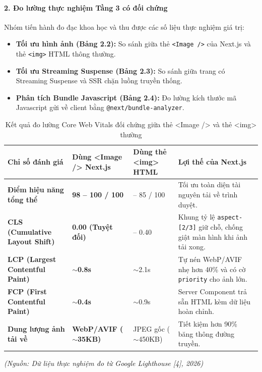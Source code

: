 \documentclass[13pt,a4paper]{extarticle}
\begin{document}
\paragraph{2. Đo lường thực nghiệm Tầng 3 có đối chứng}
Nhóm tiến hành đo đạc khoa học và thu được các số liệu thực nghiệm giá trị:
\begin{itemize}[noitemsep]
    \item \textbf{Tối ưu hình ảnh (Bảng 2.2):} So sánh giữa thẻ \texttt{<Image />} của Next.js và thẻ \texttt{<img>} HTML thông thường.
    \item \textbf{Tối ưu Streaming Suspense (Bảng 2.3):} So sánh giữa trang có Streaming Suspense và SSR chặn luồng truyền thống.
    \item \textbf{Phân tích Bundle Javascript (Bảng 2.4):} Đo lường kích thước mã Javascript gửi về client bằng \texttt{@next/bundle-analyzer}.
\end{itemize}

\begin{table}[H]
\centering
\caption{Kết quả đo lường Core Web Vitals đối chứng giữa thẻ <Image /> và thẻ <img> thường}
\label{tab:vitals}
\begin{tabularx}{\textwidth}{>{\raggedright\arraybackslash}p{4.5cm}>{\centering\arraybackslash}p{3cm}>{\centering\arraybackslash}p{3cm}>{\raggedright\arraybackslash}X}
\toprule
\textbf{Chỉ số đánh giá} & \textbf{Dùng <Image /> Next.js} & \textbf{Dùng thẻ <img> HTML} & \textbf{Lợi thế của Next.js} \\
\midrule
\textbf{Điểm hiệu năng tổng thể} & \textbf{98 -- 100 / 100} & 78 -- 85 / 100 & Tối ưu toàn diện tài nguyên tải về trình duyệt. \\
\midrule
\textbf{CLS (Cumulative Layout Shift)} & \textbf{0.00 (Tuyệt đối)} & 0.25 -- 0.40 & Khung tỷ lệ \texttt{aspect-[2/3]} giữ chỗ, chống giật màn hình khi ảnh tải xong. \\
\midrule
\textbf{LCP (Largest Contentful Paint)} & \textbf{$\sim$0.8s} & $\sim$2.1s & Tự nén WebP/AVIF nhẹ hơn 40\% và có cờ \texttt{priority} cho ảnh lớn. \\
\midrule
\textbf{FCP (First Contentful Paint)} & \textbf{$\sim$0.4s} & $\sim$0.9s & Server Component trả sẵn HTML kèm dữ liệu hoàn chỉnh. \\
\midrule
\textbf{Dung lượng ảnh tải về} & \textbf{WebP/AVIF ($\sim$35KB)} & JPEG gốc ($\sim$450KB) & Tiết kiệm hơn 90\% băng thông đường truyền. \\
\bottomrule
\end{tabularx}
\end{table}
\begin{flushleft}\small\textit{(Nguồn: Dữ liệu thực nghiệm đo từ Google Lighthouse [4], 2026)}\end{flushleft}
\end{document}
